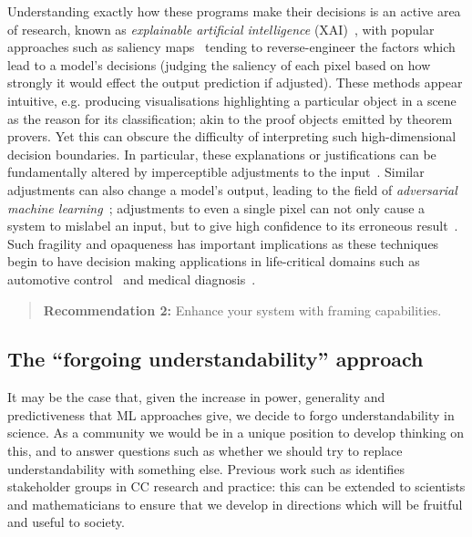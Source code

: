 \documentclass[letterpaper]{article}
\begin{document}
Understanding exactly how these programs make their decisions is an
active area of research, known as \emph{explainable artificial
  intelligence}
(XAI)~\cite{dovsilovic2018explainable,doshi2017towards,molnar2018interpretable},
with popular approaches such as saliency maps~\cite{simonyan2013deep}
tending to reverse-engineer the factors which lead to a model's
decisions (judging the saliency of each pixel based on how strongly it
would effect the output prediction if adjusted). These methods appear
intuitive, e.g. producing visualisations highlighting a particular
object in a scene as the reason for its classification; akin to the
proof objects emitted by theorem provers. Yet this can obscure the
difficulty of interpreting such high-dimensional decision
boundaries. In particular, these explanations or justifications can be
fundamentally altered by imperceptible adjustments to the
input~\cite{ghorbani2017interpretation}. Similar adjustments can also
change a model's output, leading to the field of \emph{adversarial
  machine learning}~\cite{goodfellow2014explaining}; adjustments to
even a single pixel can not only cause a system to mislabel an input,
but to give high confidence to its erroneous
result~\cite{su2019one}. Such fragility and opaqueness has important
implications as these techniques begin to have decision making
applications in life-critical domains such as automotive
control~\cite{bojarski2016end} and medical
diagnosis~\cite{esteva2017dermatologist}.


\begin{quote}
{\bf Recommendation 2:} Enhance your system with framing capabilities.

\end{quote}


\subsection{The ``forgoing understandability'' approach}
It may be the case that, given the increase in power, generality and
predictiveness that ML approaches give, we decide to forgo
understandability in science. As a community we would be in a unique
position to develop thinking on this, and to answer questions such as
whether we should try to replace understandability with something
else. Previous work such as \cite{colton:2015} identifies stakeholder
groups in CC research and practice: this can be extended to scientists
and mathematicians to ensure that we develop in directions which will
be fruitful and useful to society. 
\end{document}
